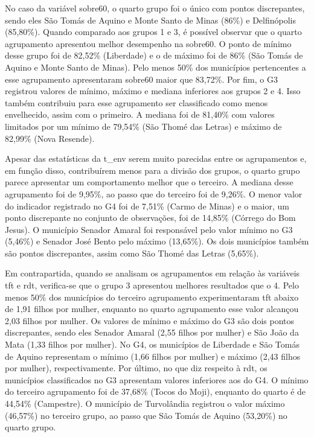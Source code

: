 \documentclass[10pt,twoside]{article}
\begin{document}
No caso da variável sobre60, o quarto grupo foi o único com pontos discrepantes, sendo eles São Tomás de Aquino e Monte Santo de Minas (86\%) e Delfinópolis (85,80\%). Quando comparado aos grupos 1 e 3, é possível observar que o quarto agrupamento apresentou melhor desempenho na sobre60. O ponto de mínimo desse grupo foi de 82,52\% (Liberdade) e o de máximo foi de 86\% (São Tomás de Aquino e Monte Santo de Minas). Pelo menos 50\% dos municípios pertencentes a esse agrupamento apresentaram sobre60 maior que 83,72\%. Por fim, o G3 registrou valores de mínimo, máximo e mediana inferiores aos grupos 2 e 4. Isso também contribuiu para esse agrupamento ser classificado como menos envelhecido, assim com o primeiro. A mediana foi de 81,40\% com valores limitados por um mínimo de 79,54\% (São Thomé das Letras) e máximo de 82,99\% (Nova Resende). 

Apesar das estatísticas da t\_env serem muito parecidas entre os agrupamentos e, em função disso, contribuírem menos para a divisão dos grupos, o quarto grupo parece apresentar um comportamento melhor que o terceiro. A mediana desse agrupamento foi de 9,95\%, ao passo que do terceiro foi de 9,26\%. O menor valor do indicador registrado no G4 foi de 7,51\% (Carmo de Minas) e o maior, um ponto discrepante no conjunto de observações, foi de 14,85\% (Córrego do Bom Jesus). O município Senador Amaral foi responsável pelo valor mínimo no G3 (5,46\%) e Senador José Bento pelo máximo (13,65\%). Os dois municípios também são pontos discrepantes, assim como São Thomé das Letras (5,65\%).

Em contrapartida, quando se analisam os agrupamentos em relação às variáveis tft e rdt, verifica-se que o grupo 3 apresentou melhores resultados que o 4. Pelo menos 50\% dos municípios do terceiro agrupamento experimentaram tft abaixo de 1,91 filhos por mulher, enquanto no quarto agrupamento esse valor alcançou 2,03 filhos por mulher. Os valores de mínimo e máximo do G3 são dois pontos discrepantes, sendo eles Senador Amaral (2,55 filhos por mulher) e São João da Mata (1,33 filhos por mulher). No G4, os municípios de Liberdade e São Tomás de Aquino representam o mínimo (1,66 filhos por mulher) e máximo (2,43 filhos por mulher), respectivamente. Por último, no que diz respeito à rdt, os municípios classificados no G3 apresentam valores inferiores aos do G4. O mínimo do terceiro agrupamento foi de 37,68\% (Tocos do Moji), enquanto do quarto é de 44,54\% (Campestre). O município de Turvolândia registrou o valor máximo (46,57\%) no terceiro grupo, ao passo que São Tomás de Aquino (53,20\%) no quarto grupo.
\end{document}
